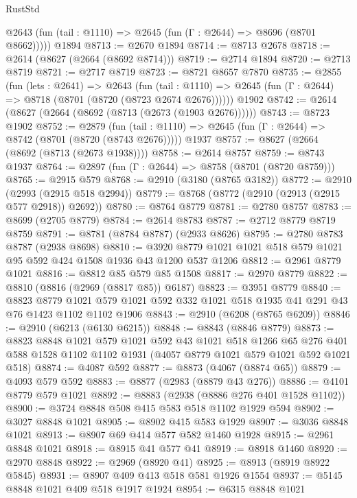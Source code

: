 \begin{lexlean}{RustStd}
\begin{coremodule}
      @2643 (fun (tail : @1110) => @2645 (fun (Γ : @2644) => @8696 (@8701 @8662)))))
    @1894
@8713 := @2670 @1894
@8714 := @8713 @2678
@8718 := @2614 (@8627 (@2664 (@8692 @8714)))
@8719 := @2714 @1894
@8720 := @2713 @8719
@8721 := @2717 @8719
@8723 := @8721 @8657 @7870
@8735 := @2855
    (fun (lets : @2641) =>
    @2643
      (fun (tail : @1110) => @2645 (fun (Γ : @2644) => @8718 (@8701 (@8720 (@8723 @2674 @2676))))))
    @1902
@8742 := @2614 (@8627 (@2664 (@8692 (@8713 (@2673 (@1903 @2676))))))
@8743 := @8723 @1902
@8752 := @2879
    (fun (tail : @1110) => @2645 (fun (Γ : @2644) => @8742 (@8701 (@8720 (@8743 @2676)))))
    @1937
@8757 := @8627 (@2664 (@8692 (@8713 (@2673 @1938))))
@8758 := @2614 @8757
@8759 := @8743 @1937
@8764 := @2897 (fun (Γ : @2644) => @8758 (@8701 (@8720 @8759)))
@8765 := @2915 @579
@8768 := @2910 (@3180 (@8765 @3182))
@8772 := @2910 (@2993 (@2915 @518 @2994))
@8779 := @8768 (@8772 (@2910 (@2913 (@2915 @577 @2918)) @2692))
@8780 := @8764 @8779
@8781 := @2780 @8757
@8783 := @8699 (@2705 @8779)
@8784 := @2614 @8783
@8787 := @2712 @8779 @8719 @8759
@8791 := @8781 (@8784 @8787) (@2933 @8626)
@8795 := @2780 @8783 @8787 (@2938 @8698)
@8810 := @3920 @8779 @1021 @1021 @518 @579 @1021 @95 @592 @424 @1508 @1936 @43 @1200 @537 @1206
@8812 := @2961 @8779 @1021
@8816 := @8812 @85 @579 @85 @1508
@8817 := @2970 @8779
@8822 := @8810 (@8816 (@2969 (@8817 @85)) @6187)
@8823 := @3951 @8779
@8840 := @8823
    @8779
    @1021
    @579
    @1021
    @592
    @332
    @1021
    @518
    @1935
    @41
    @291
    @43
    @76
    @1423
    @1102
    @1102
    @1906
@8843 := @2910 (@6208 (@8765 @6209))
@8846 := @2910 (@6213 (@6130 @6215))
@8848 := @8843 (@8846 @8779)
@8873 := @8823
    @8848
    @1021
    @579
    @1021
    @592
    @43
    @1021
    @518
    @1266
    @65
    @276
    @401
    @588
    @1528
    @1102
    @1102
    @1931
    (@4057 @8779 @1021 @579 @1021 @592 @1021 @518)
@8874 := @4087 @592
@8877 := @8873 (@4067 (@8874 @65))
@8879 := @4093 @579 @592
@8883 := @8877 (@2983 (@8879 @43 @276))
@8886 := @4101 @8779 @579 @1021
@8892 := @8883 (@2938 (@8886 @276 @401 @1528 @1102))
@8900 := @3724 @8848 @508 @415 @583 @518 @1102 @1929 @594
@8902 := @3027 @8848 @1021
@8905 := @8902 @415 @583 @1929
@8907 := @3036 @8848 @1021
@8913 := @8907 @69 @414 @577 @582 @1460 @1928
@8915 := @2961 @8848 @1021
@8918 := @8915 @41 @577 @41
@8919 := @8918 @1460
@8920 := @2970 @8848
@8922 := @2969 (@8920 @41)
@8925 := @8913 (@8919 @8922 @5845)
@8931 := @8907 @409 @413 @518 @581 @1926 @1554
@8937 := @5145 @8848 @1021 @409 @518 @1917 @1924
@8954 := @6315
    @8848
    @1021

\end{coremodule}
\end{lexlean}
